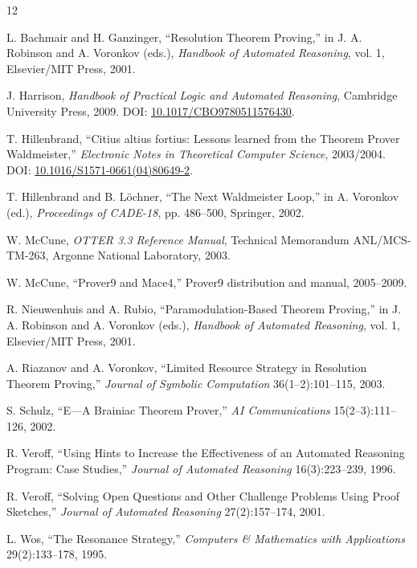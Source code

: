 \documentclass[11pt]{article}
\begin{document}
\begin{thebibliography}{12}

L. Bachmair and H. Ganzinger,
``Resolution Theorem Proving,'' in J. A. Robinson and A. Voronkov (eds.),
\emph{Handbook of Automated Reasoning}, vol. 1, Elsevier/MIT Press, 2001.

J. Harrison, \emph{Handbook of Practical Logic and Automated Reasoning},
Cambridge University Press, 2009.
DOI: \href{https://doi.org/10.1017/CBO9780511576430}
{10.1017/CBO9780511576430}.

T. Hillenbrand,
``Citius altius fortius: Lessons learned from the Theorem Prover Waldmeister,''
\emph{Electronic Notes in Theoretical Computer Science}, 2003/2004.
DOI: \href{https://doi.org/10.1016/S1571-0661(04)80649-2}
{10.1016/S1571-0661(04)80649-2}.

T. Hillenbrand and B. L\"ochner, ``The Next Waldmeister Loop,'' in
A. Voronkov (ed.), \emph{Proceedings of CADE-18}, pp. 486--500, Springer, 2002.

W. McCune, \emph{OTTER 3.3 Reference Manual}, Technical Memorandum
ANL/MCS-TM-263, Argonne National Laboratory, 2003.

W. McCune, ``Prover9 and Mace4,'' Prover9 distribution and manual, 2005--2009.

R. Nieuwenhuis and A. Rubio, ``Paramodulation-Based Theorem Proving,'' in
J. A. Robinson and A. Voronkov (eds.), \emph{Handbook of Automated Reasoning},
vol. 1, Elsevier/MIT Press, 2001.

A. Riazanov and A. Voronkov, ``Limited Resource Strategy in Resolution Theorem
Proving,'' \emph{Journal of Symbolic Computation} 36(1--2):101--115, 2003.

S. Schulz, ``E---A Brainiac Theorem Prover,'' \emph{AI Communications}
15(2--3):111--126, 2002.

R. Veroff, ``Using Hints to Increase the Effectiveness of an Automated
Reasoning Program: Case Studies,'' \emph{Journal of Automated Reasoning}
16(3):223--239, 1996.

R. Veroff, ``Solving Open Questions and Other Challenge Problems Using Proof
Sketches,'' \emph{Journal of Automated Reasoning} 27(2):157--174, 2001.

L. Wos, ``The Resonance Strategy,'' \emph{Computers \& Mathematics with
Applications} 29(2):133--178, 1995.

\end{thebibliography}
\end{document}
